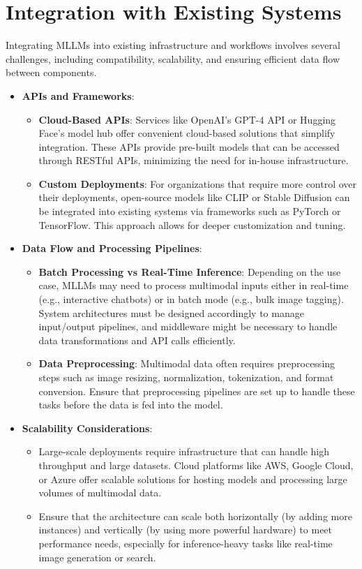 \section{Integration with Existing Systems}

Integrating MLLMs into existing infrastructure and workflows involves several challenges, including compatibility, scalability, and ensuring efficient data flow between components.

\begin{itemize}
    \item \textbf{APIs and Frameworks}:
    \begin{itemize}
        \item \textbf{Cloud-Based APIs}: Services like OpenAI's GPT-4 API or Hugging Face's model hub offer convenient cloud-based solutions that simplify integration. These APIs provide pre-built models that can be accessed through RESTful APIs, minimizing the need for in-house infrastructure.
        \item \textbf{Custom Deployments}: For organizations that require more control over their deployments, open-source models like CLIP or Stable Diffusion can be integrated into existing systems via frameworks such as PyTorch or TensorFlow. This approach allows for deeper customization and tuning.
    \end{itemize}
    \item \textbf{Data Flow and Processing Pipelines}:
    \begin{itemize}
        \item \textbf{Batch Processing vs Real-Time Inference}: Depending on the use case, MLLMs may need to process multimodal inputs either in real-time (e.g., interactive chatbots) or in batch mode (e.g., bulk image tagging). System architectures must be designed accordingly to manage input/output pipelines, and middleware might be necessary to handle data transformations and API calls efficiently.
        \item \textbf{Data Preprocessing}: Multimodal data often requires preprocessing steps such as image resizing, normalization, tokenization, and format conversion. Ensure that preprocessing pipelines are set up to handle these tasks before the data is fed into the model.
    \end{itemize}
    \item \textbf{Scalability Considerations}:
    \begin{itemize}
        \item Large-scale deployments require infrastructure that can handle high throughput and large datasets. Cloud platforms like AWS, Google Cloud, or Azure offer scalable solutions for hosting models and processing large volumes of multimodal data.
        \item Ensure that the architecture can scale both horizontally (by adding more instances) and vertically (by using more powerful hardware) to meet performance needs, especially for inference-heavy tasks like real-time image generation or search.
    \end{itemize}
\end{itemize}

